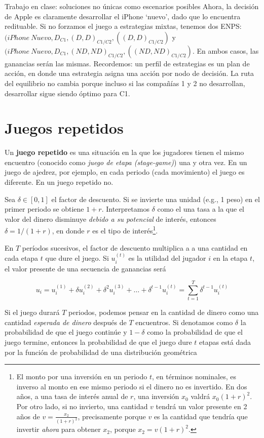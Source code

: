 \documentclass[12pt]{scrartcl}
\begin{document}
\begin{exbox}{Trabajo en clase: soluciones no únicas como escenarios posibles}
Ahora, la decisión de Apple es claramente desarrollar el iPhone `nuevo', dado que lo encuentra redituable. Si no forzamos el juego a estrategias mixtas, tenemos dos ENPS: ${(iPhone~Nuevo, D_{C1}, (D, D)_{C1/C2}, ((D, D)_{C1/C2})}$ y ${(iPhone~Nuevo, D_{C1}, (ND, ND)_{C1/C2}, ((ND, ND)_{C1/C2})}$. En ambos casos, las ganancias serán las mismas. Recordemos: un perfil de estrategias es un plan de acción, en donde una estrategia asigna una acción por nodo de decisión. La ruta del equilibrio no cambia porque incluso si las compañías 1 y 2 no desarrollan, desarrollar sigue siendo óptimo para C1.


\end{exbox}


\section{Juegos repetidos}

Un \textbf{juego repetido} es una situación en la que los jugadores tienen el mismo encuentro (conocido como \textit{juego de etapa (stage-game)}) una y otra vez. En un juego de ajedrez, por ejemplo, en cada periodo (cada movimiento) el juego es diferente. En un juego repetido no.

Sea $\delta \in [0, 1]$ el factor de descuento. Si se invierte una unidad (e.g., 1 peso) en el primer periodo se obtiene $1 + r$. Interpretamos $\delta$ como el una tasa a la que el valor del dinero disminuye \textit{debido a su potencial} de interés, entonces $\delta = 1/(1+r)$, en donde $r$ es el tipo de interés\footnote{
El monto por una inversión en un periodo $t$, en términos nominales, es inverso al monto en ese mismo periodo si el dinero no es invertido. En dos años, a una tasa de interés anual de $r$, una inversión $x_0$ valdrá $x_0(1+r)^2$. Por otro lado, si no invierto, una cantidad $v$ tendrá un valor presente en 2 años de $v=\frac{x_2}{(1+r)^2}$, precisamente porque $v$ es la cantidad que tendría que invertir \textit{ahora} para obtener $x_2$, porque $x_2=v(1+r)^2$.
}. 

En $T$ períodos sucesivos, el factor de descuento multiplica a a una cantidad en cada etapa $t$ que dure el juego. Si $u_i^{(t)}$ es la utilidad del jugador $i$ en la etapa $t$, el valor presente de una secuencia de ganancias será

\[ 
    u_i = u_i^{(1)} + \delta u_i^{(2)} + \delta^2 u_i^{(3)} + \dots + \delta^{t-1} u_i^{(t)} = \sum_{t=1}^{T}\delta^{t-1} u_i^{(t)}
\]

Si el juego durará $T$ periodos, podemos pensar en la cantidad de dinero como una cantidad \textit{esperada de dinero} después de $T$ encuentros. Si denotamos como $\delta$ la probabilidad de que el juego continúe y $1 - \delta$ como la probabilidad de que el juego termine, entonces la probabilidad de que el juego dure $t$ etapas está dada por la función de probabilidad de una distribución geométrica
\end{document}
